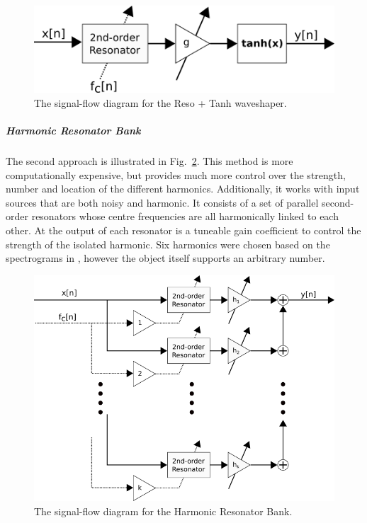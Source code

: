 \documentclass[../main.tex]{subfiles}
\begin{document}
\begin{figure}[h]
    \centering
    \includegraphics[scale=.5]{./images/diagrams/ResoTanh.png}
    \caption{The signal-flow diagram for the Reso + Tanh waveshaper.}
    \label{fig:ResoTanh}
\end{figure}

\subparagraph{Harmonic Resonator Bank}
The second approach is illustrated in Fig.~\ref{fig:HRB}. This method is more computationally expensive, but provides much more control over the strength, number and location of the different harmonics. Additionally, it works with input sources that are both noisy and harmonic. It consists of a set of parallel second-order resonators whose centre frequencies are all harmonically linked to each other. At the output of each resonator is a tuneable gain coefficient to control the strength of the isolated harmonic. Six harmonics were chosen based on the spectrograms in , however the object itself supports an arbitrary number.

\begin{figure}[h]
    \centering
    \includegraphics[scale=.5]{./images/diagrams/HarmonicResonatorBank.png}
    \caption{The signal-flow diagram for the Harmonic Resonator Bank.}
    \label{fig:HRB}
\end{figure}
\end{document}
